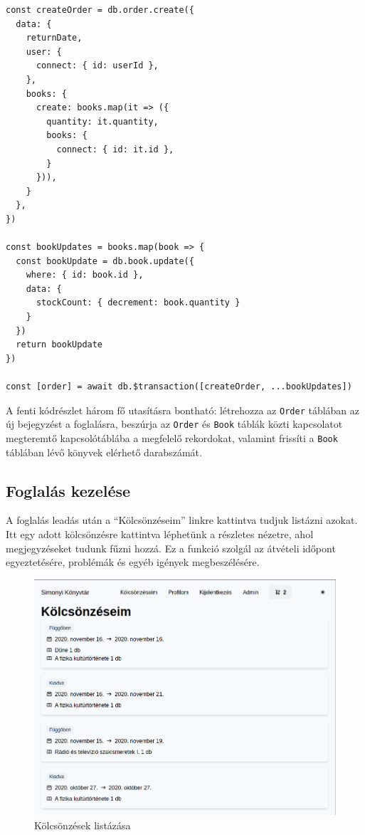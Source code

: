 \begin{lstlisting}[caption=Transaction API használata kölcsönzés létrehozásakor]
const createOrder = db.order.create({
  data: {
    returnDate,
    user: {
      connect: { id: userId },
    },
    books: {
      create: books.map(it => ({
        quantity: it.quantity,
        books: {
          connect: { id: it.id },
        }
      })),
    }
  },
})

const bookUpdates = books.map(book => {
  const bookUpdate = db.book.update({
    where: { id: book.id },
    data: {
      stockCount: { decrement: book.quantity }
    }
  })
  return bookUpdate
})

const [order] = await db.$transaction([createOrder, ...bookUpdates])
\end{lstlisting}

A fenti kódrészlet három fő utasításra bontható: létrehozza az \lstinline|Order| táblában az új bejegyzést a foglalásra,
beszúrja az \lstinline|Order| és \lstinline|Book| táblák közti kapcsolatot megteremtő kapcsolótáblába a megfelelő rekordokat,
valamint frissíti a \lstinline|Book| táblában lévő könyvek elérhető darabszámát.


\subsection{Foglalás kezelése}

A foglalás leadás után a ``Kölcsönzéseim'' linkre kattintva tudjuk listázni azokat. Itt egy adott kölcsönzésre kattintva
léphetünk a részletes nézetre, ahol megjegyzéseket tudunk fűzni hozzá. Ez a funkció szolgál az átvételi időpont egyeztetésére,
problémák és egyéb igények megbeszélésére.

\begin{figure}[!ht]
  \centering
  \includegraphics[width=150mm, keepaspectratio]{figures/orders-list.png}
  \caption{Kölcsönzések listázása}
  \label{fig:OrderList}
\end{figure}


